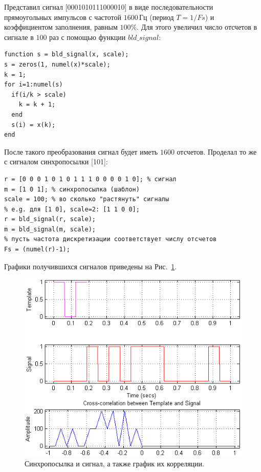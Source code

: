 \documentclass[12pt,a4paper]{article}
\begin{document}
Представил сигнал [0001010111000010] в виде последовательности прямоугольных импульсов с частотой $1600$\,Гц (период $T=1/Fs$) и коэффициентом заполнения, равным $100\%$. Для этого увеличил число отсчетов в сигнале в $100$ раз с помощью функции $bld\_signal$:
\begin{verbatim}
function s = bld_signal(x, scale);
s = zeros(1, numel(x)*scale);
k = 1;
for i=1:numel(s)
  if(i/k > scale)
    k = k + 1;
  end
  s(i) = x(k);
end
\end{verbatim}
После такого преобразования сигнал будет иметь $1600$ отсчетов. Проделал то же с сигналом синхропосылки [101]:
\begin{verbatim}
r = [0 0 0 1 0 1 0 1 1 1 0 0 0 0 1 0]; % сигнал
m = [1 0 1]; % синхропосылка (шаблон)
scale = 100; % во сколько "растянуть" сигналы
% e.g. для [1 0], scale=2: [1 1 0 0];
r = bld_signal(r, scale);
m = bld_signal(m, scale);
% пусть частота дискретизации соответствует числу отсчетов
Fs = (numel(r)-1);
\end{verbatim}
Графики получившихся сигналов приведены на Рис.~\ref{img:xcorr_tsa}.
\begin{figure}[H]
\includegraphics[width=\linewidth]{xcorr_tsa}
\caption{Синхропосылка и сигнал, а также график их корреляции.}
\label{img:xcorr_tsa}
\end{figure}
\end{document}
